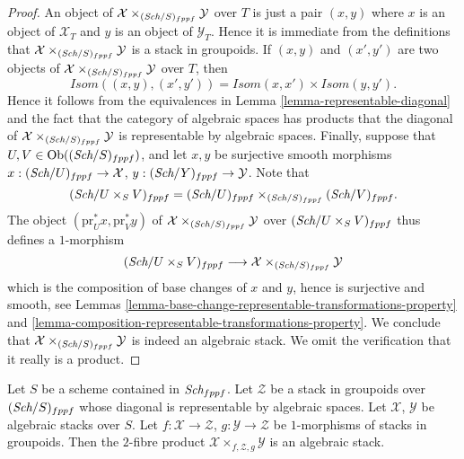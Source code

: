 \begin{proof}
An object of $\mathcal{X} \times_{(\textit{Sch}/S)_{fppf}} \mathcal{Y}$
over $T$ is just a pair $(x, y)$ where $x$ is an object of $\mathcal{X}_T$
and $y$ is an object of $\mathcal{Y}_T$. Hence it is immediate from
the definitions that
$\mathcal{X} \times_{(\textit{Sch}/S)_{fppf}} \mathcal{Y}$ is a
stack in groupoids. If $(x, y)$ and $(x', y')$ are
two objects of $\mathcal{X} \times_{(\textit{Sch}/S)_{fppf}} \mathcal{Y}$
over $T$, then
$$
\mathit{Isom}((x, y), (x', y')) =
\mathit{Isom}(x, x') \times \mathit{Isom}(y, y').
$$
Hence it follows from the equivalences in
Lemma \ref{lemma-representable-diagonal}
and the fact that the category of algebraic spaces has products
that the diagonal of $\mathcal{X} \times_{(\textit{Sch}/S)_{fppf}} \mathcal{Y}$
is representable by algebraic spaces.
Finally, suppose that $U, V \in \text{Ob}((\textit{Sch}/S)_{fppf})$,
and let $x, y$ be surjective smooth morphisms
$x : (\textit{Sch}/U)_{fppf} \to \mathcal{X}$,
$y : (\textit{Sch}/Y)_{fppf} \to \mathcal{Y}$.
Note that
$$
(\textit{Sch}/U \times_S V)_{fppf} =
(\textit{Sch}/U)_{fppf}
\times_{(\textit{Sch}/S)_{fppf}} (\textit{Sch}/V)_{fppf}.
$$
The object $(\text{pr}_U^*x, \text{pr}_V^*y)$ of
$\mathcal{X} \times_{(\textit{Sch}/S)_{fppf}} \mathcal{Y}$ over
$(\textit{Sch}/U \times_S V)_{fppf}$ thus defines a $1$-morphism
$$
(\textit{Sch}/U \times_S V)_{fppf}
\longrightarrow
\mathcal{X} \times_{(\textit{Sch}/S)_{fppf}} \mathcal{Y}
$$
which is the composition of base changes of $x$ and $y$, hence
is surjective and smooth, see
Lemmas \ref{lemma-base-change-representable-transformations-property} and
\ref{lemma-composition-representable-transformations-property}.
We conclude that $\mathcal{X} \times_{(\textit{Sch}/S)_{fppf}} \mathcal{Y}$
is indeed an algebraic stack. We omit the verification that it
really is a product.
\end{proof}

\begin{lemma}
\label{lemma-2-fibre-product-general}
Let $S$ be a scheme contained in $\textit{Sch}_{fppf}$.
Let $\mathcal{Z}$ be a stack in groupoids over $(\textit{Sch}/S)_{fppf}$
whose diagonal is representable by algebraic spaces.
Let $\mathcal{X}$, $\mathcal{Y}$ be algebraic stacks over $S$.
Let $f : \mathcal{X} \to \mathcal{Z}$, $g : \mathcal{Y} \to \mathcal{Z}$
be $1$-morphisms of stacks in groupoids. Then the $2$-fibre product
$\mathcal{X} \times_{f, \mathcal{Z}, g} \mathcal{Y}$ is an algebraic stack.
\end{lemma}

